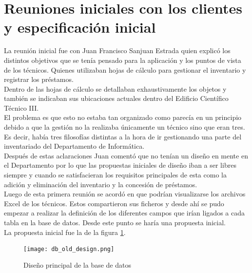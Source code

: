 \section{Reuniones iniciales con los clientes y especificación inicial}

La reunión inicial fue con Juan Francisco Sanjuan Estrada quien explicó los distintos objetivos que se tenía pensado para la aplicación y los puntos de vista de los técnicos. Quienes utilizaban hojas de cálculo para gestionar el inventario y registrar los préstamos.
\\Dentro de las hojas de cálculo se detallaban exhaustivamente los objetos y también se indicaban sus ubicaciones actuales dentro del Edificio Científico Técnico III.
\\El problema es que esto no estaba tan organizado como parecía en un principio debido a que la gestión no la realizaba únicamente un técnico sino que eran tres. Es decir, había tres filosofías distintas a la hora de ir gestionando una parte del inventariado del Departamento de Informática.
\\Después de estas aclaraciones Juan comentó que no tenían un diseño en mente en el Departamento por lo que las propuestas iniciales de diseño iban a ser libres siempre y cuando se satisfacieran los requisitos principales de esta como la adición y eliminación del inventario y la concesión de préstamos.
\vspace{\baselineskip}
\\Luego de esta primera reunión se acordó en que podrían visualizarse los archivos Excel de los técnicos. Estos compartieron sus ficheros y desde ahí se pudo empezar a realizar la definición de los diferentes campos que irían ligados a cada tabla en la base de datos. Desde este punto se haría una propuesta inicial.
\\La propuesta inicial fue la de la figura \ref{diseno_principal_base_datos}.

\begin{figure}[ht]
    \texttt{[image: db\_old\_design.png]}
    \caption{Diseño principal de la base de datos}\label{diseno_principal_base_datos}
\end{figure}

